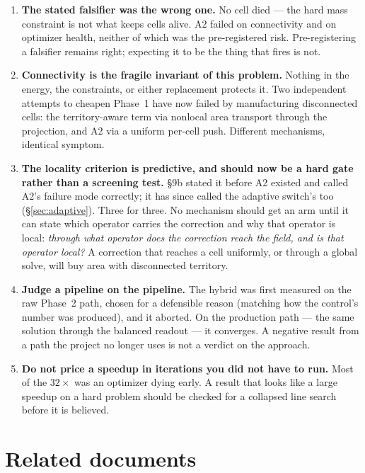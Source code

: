 \documentclass[11pt,a4paper]{article}
\begin{document}
\begin{enumerate}
  \item \textbf{The stated falsifier was the wrong one.} No cell died --- the
    hard mass constraint is not what keeps cells alive. A2 failed on connectivity
    and on optimizer health, neither of which was the pre-registered risk.
    Pre-registering a falsifier remains right; expecting it to be the thing that
    fires is not.
  \item \textbf{Connectivity is the fragile invariant of this problem.} Nothing
    in the energy, the constraints, or either replacement protects it. Two
    independent attempts to cheapen Phase~1 have now failed by manufacturing
    disconnected cells: the territory-aware term via nonlocal area transport
    through the projection, and A2 via a uniform per-cell push. Different
    mechanisms, identical symptom.
  \item \textbf{The locality criterion is predictive, and should now be a hard
    gate rather than a screening test.} \S9b stated it before A2 existed and
    called A2's failure mode correctly; it has since called the adaptive
    switch's too (\S\ref{sec:adaptive}). Three for three. No mechanism should
    get an arm until it can state which operator carries the correction and why
    that operator is local: \emph{through what operator does the correction reach the field, and is
    that operator local?} A correction that reaches a cell uniformly, or through
    a global solve, will buy area with disconnected territory.
  \item \textbf{Judge a pipeline on the pipeline.} The hybrid was first measured
    on the raw Phase~2 path, chosen for a defensible reason (matching how the
    control's number was produced), and it aborted. On the production path --- the
    same solution through the balanced readout --- it converges. A negative result
    from a path the project no longer uses is not a verdict on the approach.
  \item \textbf{Do not price a speedup in iterations you did not have to run.}
    Most of the \(32\times\) was an optimizer dying early. A result that looks
    like a large speedup on a hard problem should be checked for a collapsed line
    search before it is believed.
\end{enumerate}

\section*{Related documents}
\end{document}
